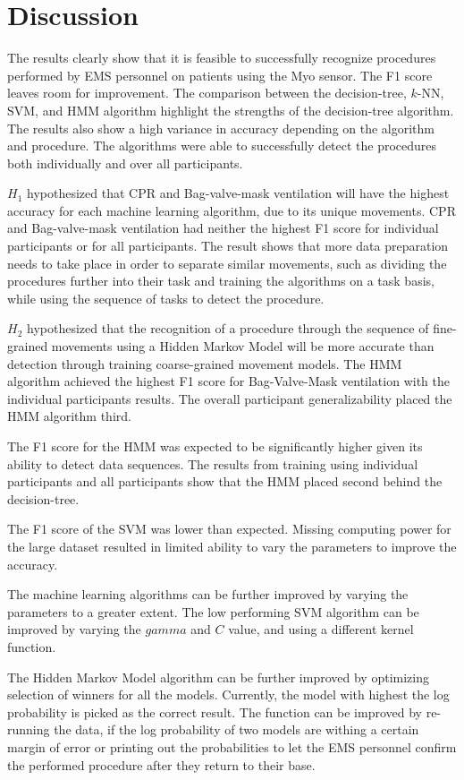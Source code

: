 \section{Discussion}
\label{sec:Results:Discussion}
The results clearly show that it is feasible to successfully recognize procedures performed by EMS personnel on patients using the Myo sensor. The F1 score leaves room for improvement. The comparison between the decision-tree, $k$-NN, SVM, and HMM algorithm highlight the strengths of the decision-tree algorithm. The results also show a high variance in accuracy depending on the algorithm and procedure. The algorithms were able to successfully detect the procedures both individually and over all participants.
\par $H_1$ hypothesized that CPR and Bag-valve-mask ventilation will have the highest accuracy for each machine learning algorithm, due to its unique movements. CPR and Bag-valve-mask ventilation had neither the highest F1 score for individual participants or for all participants. The result shows that more data preparation needs to take place in order to separate similar movements, such as dividing the procedures further into their task and training the algorithms on a task basis, while using the sequence of tasks to detect the procedure.
\par $H_2$ hypothesized that the recognition of a procedure through the sequence of fine-grained movements using a Hidden Markov Model will be more accurate than detection through training coarse-grained movement models. The HMM algorithm achieved the highest F1 score for Bag-Valve-Mask ventilation with the individual participants results. The overall participant generalizability placed the HMM algorithm third.
\par The F1 score for the HMM was expected to be significantly higher given its ability to detect data sequences. The results from training using individual participants and all participants show that the HMM placed second behind the decision-tree.
\par The F1 score of the SVM was lower than expected. Missing computing power for the large dataset resulted in limited ability to vary the parameters to improve the accuracy. 
\par The machine learning algorithms can be further improved by varying the parameters to a greater extent. The low performing SVM algorithm can be improved by varying the $gamma$ and $C$ value, and using a different kernel function.
\par The Hidden Markov Model algorithm can be further improved by optimizing selection of winners for all the models. Currently, the model with highest the log probability is picked as the correct result. The function can be improved by re-running the data, if the log probability of two models are withing a certain margin of error or printing out the probabilities to let the EMS personnel confirm the performed procedure after they return to their base.
